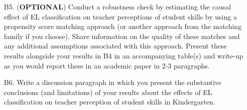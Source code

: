 \documentclass[a4paper, 11pt]{article}
\begin{document}
\begin{enumerate}
	\item[B5.] (\textbf{OPTIONAL}) Conduct a robustness check by estimating the causal effect of EL classification on teacher perceptions of student skills by using a propensity score matching approach (or another approach from the matching family if you choose). Share information on the quality of these matches and any additional assumptions associated with this approach. Present these results alongside your results in B4 in an accompanying table(s) and write-up as you would report these in an academic paper in 2-3 paragraphs.
	\item[B6.] Write a discussion paragraph in which you present the substantive conclusions (and limitations) of your results about the effects of EL classification on teacher perception of student skills in Kindergarten.
	
\end{enumerate}
\end{document}
